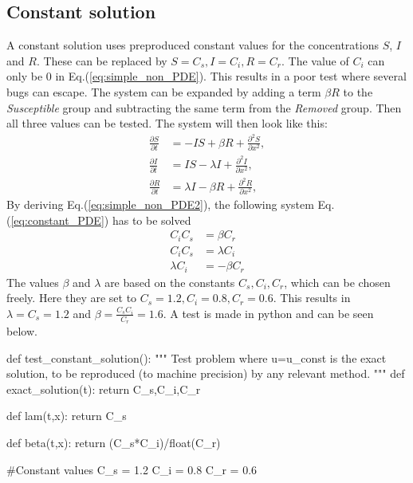 \documentclass[%
twoside,                 %
final,                   %
chapterprefix=true,      %
open=right               %
10pt]{book}
\begin{document}
\subsection{Constant solution}
A constant solution uses preproduced constant values for the concentrations $S$, $I$ and $R$. These can be replaced by $S = C_s,I=C_i,R=C_r$. The value of $C_i$ can only be 0 in Eq.(\ref{eq:simple_non_PDE}). This results in a poor test where several bugs can escape. The system can be expanded by adding a term $\beta R$ to the \emph{Susceptible} group and subtracting the same term from the \emph{Removed} group. Then all three values can be tested. The system will then look like this: 
\begin{equation} \label{eq:simple_non_PDE2}
	\begin{aligned}
	\frac{\partial S}{\partial t} &= -IS + \beta R + \frac{\partial^2 S}{\partial x^2},\\
	\frac{\partial I}{\partial t} &= IS- \lambda I + \frac{\partial^2 I}{\partial x^2},\\
	\frac{\partial R}{\partial t} &= \lambda I - \beta R + \frac{\partial^2 R}{\partial x^2},
	\end{aligned}
\end{equation}
By deriving Eq.(\ref{eq:simple_non_PDE2}), the following system Eq.(\ref{eq:constant_PDE}) has to be solved
\begin{equation} \label{eq:constant_PDE}
	\begin{aligned}
	C_iC_s &= \beta C_r \\
	C_iC_s &= \lambda C_i \\
	\lambda C_i &= -\beta C_r 
	\end{aligned}
\end{equation}
The values $\beta$ and $\lambda$ are based on the constants $C_s,C_i,C_r$, which can be chosen freely. Here they are set to $C_s = 1.2,C_i=0.8,C_r=0.6$. This results in $\lambda= C_s = 1.2$ and $\beta= \frac{C_s C_i}{C_r}=1.6$. A test is made in python and can be seen below.

\bpycod
def test_constant_solution():
    """
    Test problem where u=u_const is the exact solution, to be
    reproduced (to machine precision) by any relevant method.
    """
    def exact_solution(t):
        return C_s,C_i,C_r
    
    def lam(t,x):
        return C_s

    def beta(t,x):
        return (C_s*C_i)/float(C_r)

    #Constant values
    C_s = 1.2
    C_i = 0.8
    C_r = 0.6
    
\end{document}

